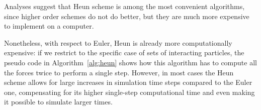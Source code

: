 \documentclass[../../master_thesis_np.tex]{subfiles}
\begin{document}
		Analyses suggest that Heun scheme is among the most convenient algorithms, since higher order schemes do not do better, but they are much more expensive to implement on a computer. 
		
		Nonetheless, with respect to Euler, Heun is already more computationally expensive: if we restrict to the specific case of sets of interacting particles, the pseudo code in Algorithm~\ref{alg:heun} shows how this algorithm has to compute all the forces twice to perform a single step. 
		However, in most cases the Heun scheme allows for large increases in simulation time steps compared to the Euler one, compensating for its higher single-step computational time and even making it possible to simulate larger times.		
		
\end{document}

